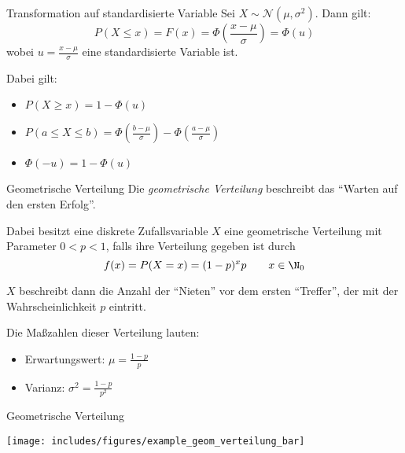 \begin{algo}{Transformation auf standardisierte Variable}
    Sei $X \sim \mathcal{N}(\mu,\sigma^2)$.
    Dann gilt:
    \[
        P(X \leq x) = F(x) = \Phi \left( \frac{x-\mu}{\sigma} \right) = \Phi (u)
    \]
    wobei $u = \frac{x-\mu}{\sigma}$ eine standardisierte Variable ist.

    Dabei gilt:
    \begin{itemize}
        \item $P(X \geq x) = 1 - \Phi(u)$
        \item $P(a \leq X \leq b) = \Phi \left( \frac{b - \mu}{\sigma} \right) - \Phi \left( \frac{a - \mu}{\sigma} \right)$
        \item $\Phi(-u) = 1 - \Phi(u)$
    \end{itemize}
\end{algo}

\begin{defi}{Geometrische Verteilung}
    Die \emph{geometrische Verteilung} beschreibt das \enquote{Warten auf den ersten Erfolg}.

    Dabei besitzt eine diskrete Zufallsvariable $X$ eine geometrische Verteilung mit Parameter $0 < p < 1$, falls ihre Verteilung gegeben ist durch
    \[
        f(x) = P(X = x) = (1-p)^xp \qquad x \in \N_0
    \]

    $X$ beschreibt dann die Anzahl der \enquote{Nieten} vor dem ersten \enquote{Treffer}, der mit der Wahrscheinlichkeit $p$ eintritt.

    Die Maßzahlen dieser Verteilung lauten:
    \begin{itemize}
        \item Erwartungswert: $\mu = \frac{1-p}{p}$
        \item Varianz: $\sigma^2 = \frac{1-p}{p^2}$
    \end{itemize}
\end{defi}

\begin{example}{Geometrische Verteilung}
    \begin{center}
        \texttt{[image: includes/figures/example\_geom\_verteilung\_bar]}
    \end{center}
\end{example}

